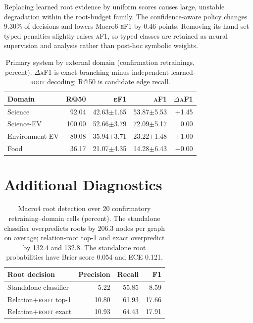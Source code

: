 \documentclass[11pt]{article}
\newcommand{\rootnode}{\textsc{root}}
\newcommand{\ef}{\textsc{eF1}}
\newcommand{\af}{\textsc{aF1}}
\begin{document}
Replacing learned root evidence by uniform scores causes large, unstable
degradation within the root-budget family. The confidence-aware policy changes
9.30\% of decisions and lowers Macro6 \ef{} by 0.46 points. Removing its
hand-set typed penalties slightly raises \af{}, so typed classes are retained
as neural supervision and analysis rather than post-hoc symbolic weights.

\begin{table}[h]
\centering
\scriptsize
\setlength{\tabcolsep}{3pt}
\begin{tabular}{lrrrr}
\toprule
Domain & R@50 & \ef & \af & $\Delta$\af \\
\midrule
Science & 92.04 & 42.63$\pm$1.65 & 53.87$\pm$5.53 & +1.45 \\
Science-EV & 100.00 & 52.66$\pm$3.79 & 72.09$\pm$5.17 & 0.00 \\
Environment-EV & 80.08 & 35.94$\pm$3.71 & 23.22$\pm$1.48 & +1.00 \\
Food & 36.17 & 21.07$\pm$4.35 & 14.28$\pm$6.43 & $-$0.00 \\
\bottomrule
\end{tabular}
\caption{Primary system by external domain (confirmation retrainings, percent).
$\Delta$\af{} is exact branching minus independent learned-\rootnode{}
decoding; R@50 is candidate edge recall.}
\label{tab:domains}
\end{table}

\section{Additional Diagnostics}
\label{app:additional-diagnostics}

\begin{table}[h]
\centering
\small
\begin{tabular}{lrrr}
\toprule
Root decision & Precision & Recall & F1\\
\midrule
Standalone classifier & 5.22 & 55.85 & 8.59\\
Relation+\rootnode{} top-1 & 10.80 & 61.93 & 17.66\\
Relation+\rootnode{} exact & 10.93 & 64.43 & 17.91\\
\bottomrule
\end{tabular}
\caption{Macro4 root detection over 20 confirmatory retraining--domain cells
(percent). The standalone classifier overpredicts roots by 206.3 nodes per
graph on average; relation-root top-1 and exact overpredict by 132.4 and 132.8.
The standalone root probabilities have Brier score 0.054 and ECE 0.121.}
\label{tab:root-audit}
\end{table}
\end{document}
